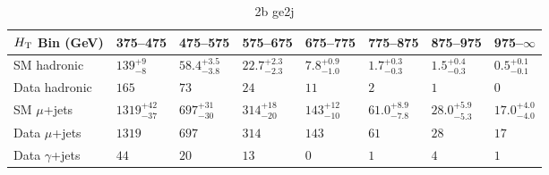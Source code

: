 \documentclass[8pt]{article}
\def\scalht{\mbox{$H_{\rm{T}}$}\xspace}
\newcommand\T{\rule{0pt}{2.6ex}}
\newcommand\B{\rule[-1.2ex]{0pt}{0pt}}
\begin{document}
\begin{table}[ht!]
\caption{2b ge2j}
\label{tab:ensemble-2b ge2j}
\centering
\begin{tabular}{ llllllll }

\hline
\scalht Bin (GeV)       & 375--475                       & 475--575                       & 575--675                       & 675--775                       & 775--875                       & 875--975                       & 975--$\infty$                  \\ [1.000000ex]
\hline
SM hadronic\T           & $139^{+9}_{-8}$                & $58.4^{+3.5}_{-3.8}$           & $22.7^{+2.3}_{-2.3}$           & $7.8^{+0.9}_{-1.0}$            & $1.7^{+0.3}_{-0.3}$            & $1.5^{+0.4}_{-0.3}$            & $0.5^{+0.1}_{-0.1}$            \\ 
Data hadronic\B         & $165$                          & $73$                           & $24$                           & $11$                           & $2$                            & $1$                            & $0$                            \\ 
\hline
SM $\mu$+jets\T         & $1319^{+42}_{-37}$             & $697^{+31}_{-30}$              & $314^{+18}_{-20}$              & $143^{+12}_{-10}$              & $61.0^{+8.9}_{-7.8}$           & $28.0^{+5.9}_{-5.3}$           & $17.0^{+4.0}_{-4.0}$           \\ 
Data $\mu$+jets\B       & $1319$                         & $697$                          & $314$                          & $143$                          & $61$                           & $28$                           & $17$                           \\ 
\hline
Data $\gamma$+jets\B    & $44$                           & $20$                           & $13$                           & $0$                            & $1$                            & $4$                            & $1$                            \\ 
\hline

\end{tabular}
\end{table}
\end{document}
